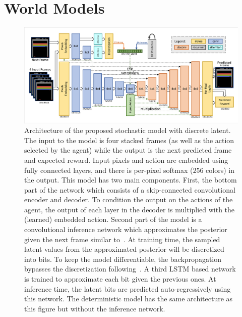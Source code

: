 \section{World Models}
\label{sec:world_models}
\label{sec:architectures}
\label{sec:training}

\begin{figure}[t]
\centering
\includegraphics[width=1.0\textwidth]{figures/model_basic_disc.pdf}
\caption{Architecture of the proposed stochastic model with discrete latent. The input to the model is four stacked frames (as well as the action selected by the agent) while the output is the next predicted frame and expected reward. Input pixels and action are embedded using fully connected layers, and there is per-pixel softmax ($256$ colors) in the output. This model has two main components. First, the bottom part of the network which consists of a skip-connected convolutional encoder and decoder. To condition the output on the actions of the agent, the output of each layer in the decoder is multiplied with the (learned) embedded action. Second part of the model is a convolutional inference network which approximates the posterior given the next frame similar to~\citet{sv2p}. At training time, the sampled latent values from the approximated posterior will be discretized into bits. To keep the model differentiable, the backpropagation bypasses the discretization following~\citet{auto_discrete}. A third LSTM based network is trained to approximate each bit given the previous ones. At inference time, the latent bits are predicted auto-regressively using this network. The deterministic model has the same architecture as this figure but without the inference network.} 
\label{fig:full_discrete}
\end{figure}



